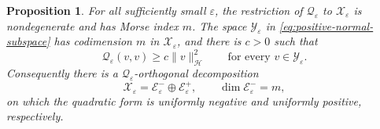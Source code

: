\documentclass[11pt]{article}
\newtheorem{proposition}[theorem]{Proposition}
\numberwithin{equation}{section}
\begin{document}
\begin{proposition}\label{prop:normal-inertia}
For all sufficiently small $\varepsilon$, the restriction of
$\mathcal Q_\varepsilon$ to $\mathcal X_\varepsilon$ is
nondegenerate and has Morse index $m$.  The space
$\mathcal Y_\varepsilon$ in \eqref{eq:positive-normal-subspace} has
codimension $m$ in $\mathcal X_\varepsilon$, and there is $c>0$ such
that
\begin{equation}\label{eq:positive-normal-coercivity}
\mathcal Q_\varepsilon(v,v)
\geq c\|v\|_{\mathcal H}^2
\qquad
\text{for every }v\in\mathcal Y_\varepsilon.
\end{equation}
Consequently there is a
$\mathcal Q_\varepsilon$-orthogonal decomposition
\begin{equation}\label{eq:normal-inertia-decomposition}
\mathcal X_\varepsilon
=\mathcal E_\varepsilon^-\oplus\mathcal E_\varepsilon^+,
\qquad
\dim\mathcal E_\varepsilon^-=m,
\end{equation}
on which the quadratic form is uniformly negative and uniformly
positive, respectively.
\end{proposition}
\end{document}
